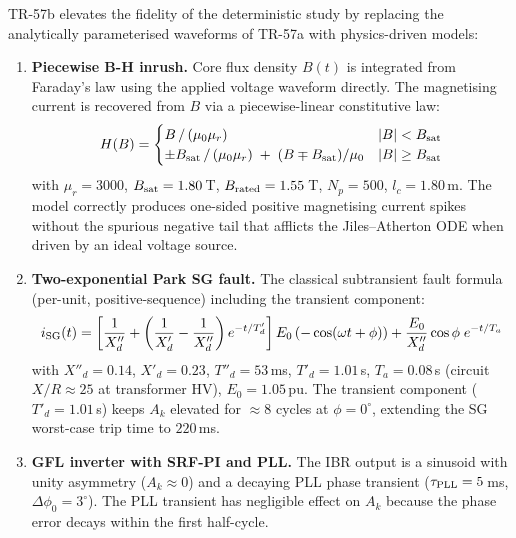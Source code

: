 \documentclass[11pt, a4paper]{article}
\newcommand{\Ak}{A_k}
\begin{document}
TR-57b elevates the fidelity of the deterministic study by replacing the
analytically parameterised waveforms of TR-57a with physics-driven models:

\begin{enumerate}
  \item \textbf{Piecewise B-H inrush.}  Core flux density $B(t)$ is
    integrated from Faraday's law using the applied voltage waveform
    directly.  The magnetising current is recovered from $B$ via a
    piecewise-linear constitutive law:
    \begin{equation}
      H(B) = \begin{cases}
        B\,/\,(\mu_0 \mu_r) & |B| < B_{\rm sat} \\
        \pm B_{\rm sat}\,/\,(\mu_0 \mu_r)\;+\;
          (B \mp B_{\rm sat})/\mu_0 & |B| \geq B_{\rm sat}
      \end{cases}
    \end{equation}
    with $\mu_r = 3000$, $B_{\rm sat} = 1.80\,$T, $B_{\rm rated} =
    1.55\,$T, $N_p = 500$, $l_c = 1.80\,$m.  The model correctly
    produces one-sided positive magnetising current spikes without the
    spurious negative tail that afflicts the Jiles--Atherton ODE
    when driven by an ideal voltage source.

  \item \textbf{Two-exponential Park SG fault.}  The classical subtransient
    fault formula (per-unit, positive-sequence) including the transient
    component:
    \begin{equation}
      i_{\rm SG}(t)
        = \left[\frac{1}{X''_d} + \left(\frac{1}{X'_d}-\frac{1}{X''_d}\right)
            e^{-t/T'_d}\right]
          E_0\,(-\cos(\omega t+\phi))
          + \frac{E_0}{X''_d}\cos\phi\;e^{-t/T_a}
    \end{equation}
    with $X''_d=0.14$, $X'_d=0.23$, $T''_d=53\,$ms, $T'_d=1.01\,$s,
    $T_a=0.08\,$s (circuit $X/R \approx 25$ at transformer HV), $E_0=1.05\,$pu.
    The transient component ($T'_d=1.01\,$s) keeps $\Ak$ elevated for
    $\approx 8$ cycles at $\phi=0^\circ$, extending the SG worst-case
    trip time to $220\,$ms.

  \item \textbf{GFL inverter with SRF-PI and PLL.}  The IBR output is a
    sinusoid with unity asymmetry ($A_k \approx 0$) and a decaying PLL
    phase transient ($\tau_{\rm PLL}=5\,$ms, $\Delta\phi_0 = 3^\circ$).
    The PLL transient has negligible effect on $\Ak$ because the phase
    error decays within the first half-cycle.


\end{enumerate}
\end{document}
